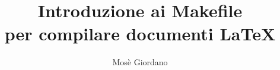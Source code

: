 \documentclass[b5paper,11pt,openany]{guidatematica}
\begin{document}
\frontmatter{}

\title{Introduzione ai Makefile \\
  per compilare documenti \LaTeX}
\author{Mosè Giordano}

\maketitle


\newpage\tableofcontents

\mainmatter{}





\backmatter{}

\end{document}
